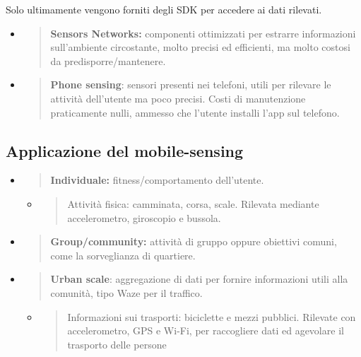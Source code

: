 Solo ultimamente vengono forniti degli SDK per accedere ai dati
rilevati.

\begin{itemize}
\item
  \begin{quote}
  \textbf{Sensors Networks:} componenti ottimizzati per estrarre
  informazioni sull'ambiente circostante, molto precisi ed efficienti,
  ma molto costosi da predisporre/mantenere.
  \end{quote}
\item
  \begin{quote}
  \textbf{Phone sensing}: sensori presenti nei telefoni, utili per
  rilevare le attività dell'utente ma poco precisi. Costi di
  manutenzione praticamente nulli, ammesso che l'utente installi l'app
  sul telefono.
  \end{quote}
\end{itemize}

\subsection{Applicazione del
mobile-sensing}\label{applicazione-del-mobile-sensing}

\begin{itemize}
\item
  \begin{quote}
  \textbf{Individuale:} fitness/comportamento dell'utente.
  \end{quote}

  \begin{itemize}
  \item
    \begin{quote}
    Attività fisica: camminata, corsa, scale. Rilevata mediante
    accelerometro, giroscopio e bussola.
    \end{quote}
  \end{itemize}
\item
  \begin{quote}
  \textbf{Group/community:} attività di gruppo oppure obiettivi comuni,
  come la sorveglianza di quartiere.
  \end{quote}
\item
  \begin{quote}
  \textbf{Urban scale}: aggregazione di dati per fornire informazioni
  utili alla comunità, tipo Waze per il traffico.
  \end{quote}

  \begin{itemize}
  \item
    \begin{quote}
    Informazioni sui trasporti: biciclette e mezzi pubblici. Rilevate
    con accelerometro, GPS e Wi-Fi, per raccogliere dati ed agevolare il
    trasporto delle persone
    \end{quote}
  \end{itemize}
\end{itemize}

